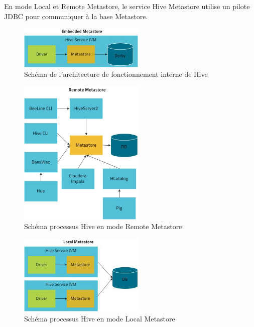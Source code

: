\documentclass[12pt,english]{book}
\begin{document}
En mode Local et Remote Metastore, le service Hive Metastore utilise un pilote JDBC pour communiquer à la base Metastore. 

\begin{figure}[H]
	\centering
	\includegraphics[width=6cm]{hiveEmbeddedMetaStore}
	\caption[Schéma processus Hive en mode Embedded Metastore]{Schéma de l'architecture de fonctionnement interne de Hive \footnotemark}
\end{figure}



\begin{figure}[H]
	\centering
	\includegraphics[width=6cm]{hiveRemoteMetaStore}
	\caption[Schéma processus Hive en mode Remote Metastore]{Schéma processus Hive en mode Remote Metastore}
\end{figure}

\begin{figure}[H]
	\centering
	\includegraphics[width=6cm]{hiveLocalMetaStore}
	\caption[Schéma processus Hive en mode Local Metastore]{Schéma processus Hive en mode Local Metastore}
\end{figure}
\end{document}
